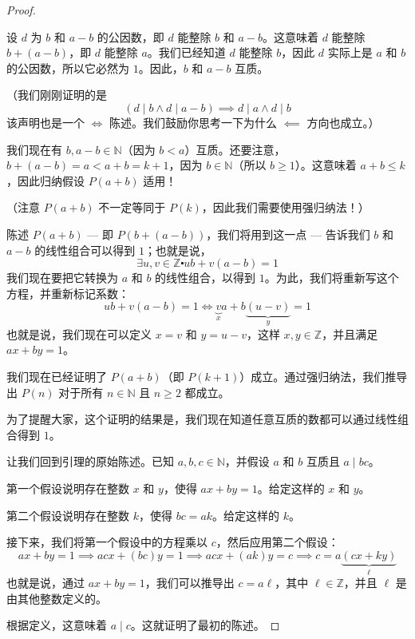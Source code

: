 \begin{proof}
\begin{tcolorbox}
            设 $d$ 为 $b$ 和 $a - b$ 的公因数，即 $d$ 能整除 $b$ 和 $a-b$。这意味着 $d$ 能整除 $b + (a-b)$，即 $d$ 能整除 $a$。我们已经知道 $d$ 能整除 $b$，因此 $d$ 实际上是 $a$ 和 $b$ 的公因数，所以它必然为 $1$。因此，$b$ 和 $a-b$ 互质。

            （我们刚刚证明的是
            \[(d \mid b \land d \mid a - b) \implies d \mid a \land d \mid b\]
            该声明也是一个 $\iff$ 陈述。我们鼓励你思考一下为什么 $\impliedby$ 方向也成立。）

            我们现在有 $b, a-b \in \mathbb{N}$（因为 $b < a$）互质。还要注意，$b + (a-b) = a < a + b = k + 1$，因为 $b \in \mathbb{N}$（所以 $b \ge 1$）。这意味着 $a + b \le k$，因此归纳假设 $P(a + b)$ 适用！

            （注意 $P(a + b)$ 不一定等同于 $P(k)$，因此我们需要使用强归纳法！）

            陈述 $P(a + b)$ --- 即 $P(b + (a - b))$，我们将用到这一点 --- 告诉我们 $b$ 和 $a - b$ 的线性组合可以得到 $1$；也就是说，
            \[\exists u, v \in \mathbb{Z} \centerdot ub + v(a - b) = 1\]
            我们现在要把它转换为 $a$ 和 $b$ 的线性组合，以得到 $1$。为此，我们将重新写这个方程，并重新标记系数：
            \[ub + v(a-b) = 1 \iff \underbrace{v}_{x} a + b \underbrace{(u - v)}_{y} = 1\]
            也就是说，我们现在可以定义 $x = v$ 和 $y = u - v$，这样 $x, y \in \mathbb{Z}$，并且满足 $ax + by = 1$。

            我们现在已经证明了 $P(a + b)$（即 $P(k + 1)$）成立。通过强归纳法，我们推导出 $P(n)$ 对于所有 $n \in \mathbb{N}$ 且 $n \ge 2$ 都成立。
    \end{tcolorbox}	

    为了提醒大家，这个证明的结果是，我们现在知道任意互质的数都可以通过线性组合得到 $1$。

    让我们回到引理的原始陈述。已知 $a, b, c \in \mathbb{N}$，并假设 $a$ 和 $b$ 互质且 $a \mid bc$。

    第一个假设说明存在整数 $x$ 和 $y$，使得 $ax + by = 1$。给定这样的 $x$ 和 $y$。

    第二个假设说明存在整数 $k$，使得 $bc = ak$。给定这样的 $k$。
    
    接下来，我们将第一个假设中的方程乘以 $c$，然后应用第二个假设：
    \[ax + by = 1 \implies acx + (bc)y = 1 \implies acx + (ak)y = c \implies c = a\underbrace{(cx + ky)}_{\ell}\]
    也就是说，通过 $ax + by = 1$，我们可以推导出 $c = a\ell$，其中 $\ell \in \mathbb{Z}$，并且 $\ell$ 是由其他整数定义的。

    根据定义，这意味着 $a \mid c$。这就证明了最初的陈述。
\end{proof}

